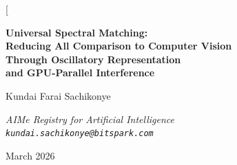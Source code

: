 \documentclass[11pt,twocolumn,a4paper]{article}
\begin{document}
\twocolumn[
\begin{@twocolumnfalse}
\begin{center}

{\LARGE\bfseries Universal Spectral Matching:\\[4pt]
Reducing All Comparison to Computer Vision\\[4pt]
Through Oscillatory Representation\\[4pt]
and GPU-Parallel Interference}

\vspace{12pt}

{\large Kundai Farai Sachikonye}

\vspace{6pt}

{\small\itshape AIMe Registry for Artificial Intelligence \\[0.3em]
\texttt{kundai.sachikonye@bitspark.com}}

\vspace{6pt}

{\small March 2026}

\vspace{14pt}


\end{center}
\end{@twocolumnfalse}
\end{document}
